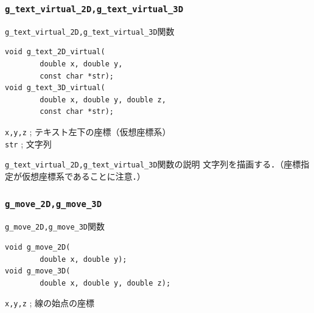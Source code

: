 \documentclass[platex,a4paper,12pt]{jsarticle}%
\begin{document}
\subsubsection{\texttt{g\_text\_virtual\_2D,g\_text\_virtual\_3D}}

\begin{itembox}[l]{\texttt{g\_text\_virtual\_2D,g\_text\_virtual\_3D}関数}
\begin{verbatim}
void g_text_2D_virtual(
        double x, double y,
        const char *str);
void g_text_3D_virtual(
        double x, double y, double z,
        const char *str);      
\end{verbatim}
\verb|x,y,z| ; テキスト左下の座標（仮想座標系）\\
\verb|str| ; 文字列\\
\end{itembox}

\begin{itembox}[l]{\texttt{g\_text\_virtual\_2D,g\_text\_virtual\_3D}関数の説明}
文字列を描画する．（座標指定が仮想座標系であることに注意．）
\end{itembox}

\begin{figure}[htb]
\end{figure}




\clearpage
\subsubsection{\texttt{g\_move\_2D,g\_move\_3D}}

\begin{itembox}[l]{\texttt{g\_move\_2D,g\_move\_3D}関数}
\begin{verbatim}
void g_move_2D(
        double x, double y);
void g_move_3D(
        double x, double y, double z);     
\end{verbatim}
\verb|x,y,z| ; 線の始点の座標\\
\end{itembox}
\end{document}
